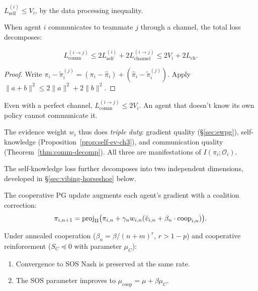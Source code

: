 \begin{proposition}
\label{prop:self-ev-ch3}
$L_{\text{self}}^{(i)} \leq V_i$, by the data processing inequality.
\end{proposition}

When agent $i$ communicates to teammate $j$ through a channel, the total loss decomposes:

\begin{theorem}
\label{thm:comm-decomp}
\begin{equation}
    L_{\text{comm}}^{(i \to j)} \leq 2 L_{\text{self}}^{(i)} + 2 L_{\text{channel}}^{(i \to j)} \leq 2 V_i + 2 L_{\text{ch}}.
\end{equation}
\end{theorem}

\begin{proof}
Write $\pi_i - \tilde{\pi}_i^{(j)} = (\pi_i - \hat{\pi}_i) + (\hat{\pi}_i - \tilde{\pi}_i^{(j)})$. Apply $\|a+b\|^2 \leq 2\|a\|^2 + 2\|b\|^2$.
\end{proof}

\begin{corollary}
\label{cor:bottleneck-ch3}
Even with a perfect channel, $L_{\text{comm}}^{(i \to j)} \leq 2 V_i$. An agent that doesn't know its own policy cannot communicate it.
\end{corollary}

The evidence weight $w_i$ thus does \emph{triple duty}: gradient quality (\S\ref{sec:ewpg}), self-knowledge (Proposition~\ref{prop:self-ev-ch3}), and communication quality (Theorem~\ref{thm:comm-decomp}). All three are manifestations of $I(\pi_i; \mathcal{O}_i)$.

The self-knowledge loss further decomposes into two independent dimensions, developed in \S\ref{sec:vibing-horseshoe} below.

The cooperative PG update augments each agent's gradient with a coalition correction:
\begin{equation}
\label{eq:coop-update-ch3}
    \pi_{i,n+1} = \operatorname{proj}_\Pi\bigl(\pi_{i,n} + \gamma_n w_{i,n} (\hat{v}_{i,n} + \beta_n \cdot \text{coop}_{i,n})\bigr).
\end{equation}

\begin{theorem}
\label{thm:coop-conv-ch3}
Under annealed cooperation ($\beta_n = \beta/(n+m)^r$, $r > 1-p$) and cooperative reinforcement ($S_C \preceq 0$ with parameter $\mu_C$):
\begin{enumerate}[label=(\roman*)]
    \item Convergence to SOS Nash is preserved at the same rate.
    \item The SOS parameter improves to $\mu_{\text{coop}} = \mu + \beta \mu_C$.
\end{enumerate}
\end{theorem}

